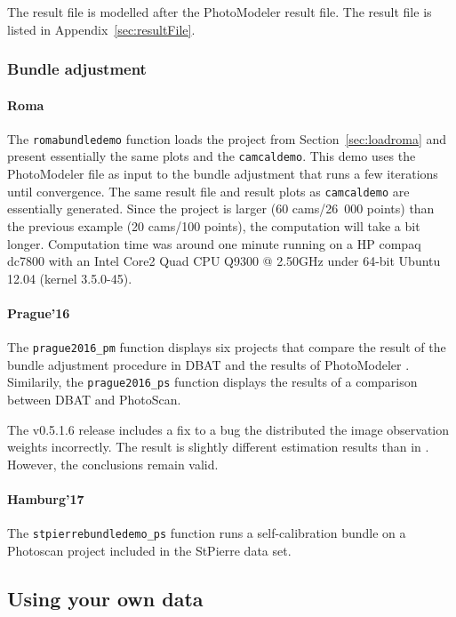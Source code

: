 \documentclass{article}
\begin{document}
The result file is modelled after the PhotoModeler result file.
The result file is listed in Appendix~\ref{sec:resultFile}.

\subsubsection{Bundle adjustment}

\paragraph{\sc Roma}
The \texttt{romabundledemo} function loads the project from
Section~\ref{sec:loadroma} and present essentially the same plots and
the \texttt{camcaldemo}. This demo uses the PhotoModeler file as input
to the bundle adjustment that runs a few iterations until convergence.
The same result file and result plots as \texttt{camcaldemo} are
essentially generated. Since the project is larger (60 cams/26~000
points) than the previous example (20 cams/100 points), the
computation will take a bit longer. Computation time was around one
minute running on a HP compaq dc7800 with an Intel Core2 Quad CPU
Q9300 @ 2.50GHz under 64-bit Ubuntu 12.04 (kernel 3.5.0-45).

\paragraph{\sc Prague'16}
The \texttt{prague2016\_pm} function displays six projects that
compare the result of the bundle adjustment procedure in DBAT and the
results of PhotoModeler \citep{Borlin2016:External}. Similarily, the
\texttt{prague2016\_ps} function displays the results of a comparison
between DBAT and PhotoScan.

The v0.5.1.6 release includes a fix to a bug the distributed the image
observation weights incorrectly. The result is slightly different
estimation results than in \citet{Borlin2016:External}. However, the
conclusions remain valid.

\paragraph{\sc Hamburg'17}
The \texttt{stpierrebundledemo\_ps} function runs a self-calibration
bundle on a Photoscan project included in the StPierre data set.

\subsection{Using your own data}
\end{document}

